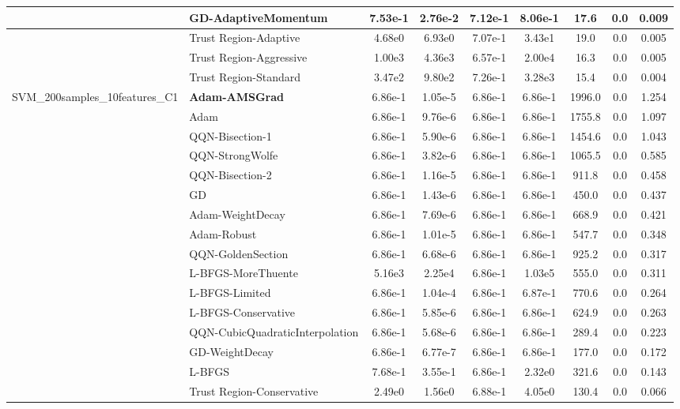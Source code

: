 \documentclass[10pt]{article}
\begin{document}
\begin{longtable}{|l|l|c|c|c|c|c|c|c|}
\hline
 & GD-AdaptiveMomentum & 7.53e-1 & 2.76e-2 & 7.12e-1 & 8.06e-1 & 17.6 & 0.0 & 0.009 \\
\hline
 & Trust Region-Adaptive & 4.68e0 & 6.93e0 & 7.07e-1 & 3.43e1 & 19.0 & 0.0 & 0.005 \\
\hline
 & Trust Region-Aggressive & 1.00e3 & 4.36e3 & 6.57e-1 & 2.00e4 & 16.3 & 0.0 & 0.005 \\
\hline
 & Trust Region-Standard & 3.47e2 & 9.80e2 & 7.26e-1 & 3.28e3 & 15.4 & 0.0 & 0.004 \\
SVM\_200samples\_10features\_C1 & \textbf{Adam-AMSGrad} & 6.86e-1 & 1.05e-5 & 6.86e-1 & 6.86e-1 & 1996.0 & 0.0 & 1.254 \\
\hline
 & Adam & 6.86e-1 & 9.76e-6 & 6.86e-1 & 6.86e-1 & 1755.8 & 0.0 & 1.097 \\
\hline
 & QQN-Bisection-1 & 6.86e-1 & 5.90e-6 & 6.86e-1 & 6.86e-1 & 1454.6 & 0.0 & 1.043 \\
\hline
 & QQN-StrongWolfe & 6.86e-1 & 3.82e-6 & 6.86e-1 & 6.86e-1 & 1065.5 & 0.0 & 0.585 \\
\hline
 & QQN-Bisection-2 & 6.86e-1 & 1.16e-5 & 6.86e-1 & 6.86e-1 & 911.8 & 0.0 & 0.458 \\
\hline
 & GD & 6.86e-1 & 1.43e-6 & 6.86e-1 & 6.86e-1 & 450.0 & 0.0 & 0.437 \\
\hline
 & Adam-WeightDecay & 6.86e-1 & 7.69e-6 & 6.86e-1 & 6.86e-1 & 668.9 & 0.0 & 0.421 \\
\hline
 & Adam-Robust & 6.86e-1 & 1.01e-5 & 6.86e-1 & 6.86e-1 & 547.7 & 0.0 & 0.348 \\
\hline
 & QQN-GoldenSection & 6.86e-1 & 6.68e-6 & 6.86e-1 & 6.86e-1 & 925.2 & 0.0 & 0.317 \\
\hline
 & L-BFGS-MoreThuente & 5.16e3 & 2.25e4 & 6.86e-1 & 1.03e5 & 555.0 & 0.0 & 0.311 \\
\hline
 & L-BFGS-Limited & 6.86e-1 & 1.04e-4 & 6.86e-1 & 6.87e-1 & 770.6 & 0.0 & 0.264 \\
\hline
 & L-BFGS-Conservative & 6.86e-1 & 5.85e-6 & 6.86e-1 & 6.86e-1 & 624.9 & 0.0 & 0.263 \\
\hline
 & QQN-CubicQuadraticInterpolation & 6.86e-1 & 5.68e-6 & 6.86e-1 & 6.86e-1 & 289.4 & 0.0 & 0.223 \\
\hline
 & GD-WeightDecay & 6.86e-1 & 6.77e-7 & 6.86e-1 & 6.86e-1 & 177.0 & 0.0 & 0.172 \\
\hline
 & L-BFGS & 7.68e-1 & 3.55e-1 & 6.86e-1 & 2.32e0 & 321.6 & 0.0 & 0.143 \\
\hline
 & Trust Region-Conservative & 2.49e0 & 1.56e0 & 6.88e-1 & 4.05e0 & 130.4 & 0.0 & 0.066 \\

\end{longtable}
\end{document}
